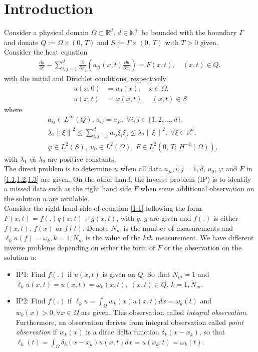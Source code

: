 \documentclass[]{article}
\begin{document}
\justifying

\thispagestyle{empty}

\newpage
\section{Introduction}
Consider a physical domain $\Omega \subset \mathbb{R}^d,\, d\in \mathbb{N^+}$ be bounded with the boundary $\Gamma$ and donate $Q:=\Omega\times (0,\, T)$ and $ S:=\Gamma \times (0,\, T)$ with $T>0$ given. 
\\
Consider the heat equation
\begin{align}\label{1.1}
	\frac{\partial u}{\partial t}-\sum_{i, j=1}^{d}\frac{\partial}{\partial x_j}\left(a_{ji}(x, t)\frac{\partial u}{\partial x_i}\right)=F(x, t), \quad(x, t)\in Q,
\end{align}
with the initial and Dirichlet conditions, respectively
\begin{align}
	u(x, 0)&=u_0(x),\quad x\in \Omega,\label{1.2}\\
	u(x, t)&=\varphi(x, t),\quad(x, t)\in S \label{1.3}
\end{align}
where
\begin{align*}
	&a_{ij}\in L^{\infty}(Q),\, a_{ij}=a_{ji},\; \forall i, j\in \{1, 2, ..., d\},\\
	&\lambda_1\left\|\xi\right\|^2\leq \sum_{i, j=1}^{d}a_{ij}\xi_i\xi_j\leq \lambda_2\left\|\xi\right\|^2,\; \forall \xi\in\mathbb{R}^d,\\
	&\varphi\in L^2(S),\; u_0\in L^2(\Omega),\; F\in L^2(0,\, T;\, H^{-1}(\Omega)),
\end{align*}
with $\lambda_1$ và $\lambda_2$ are positive constants.
\\
The direct problem is to determine $u$ when all data $a_{ji}, i, j=\overline{1, d}, \,u_0, \,\varphi$ and $F$ in \cref{1.1,1.2,1.3} are given. On the other hand, the inverse problem (IP) is to identify a missed data such as the right hand side $F$ when some additional observation on the solution $u$ are available. 
\\
Consider the right hand side of equation \eqref{1.1} following the form $F(x, t)=f(.)q(x, t)+g(x, t)$, with $q,\, g$ are given and $f(.)$ is either $f(x, t)$, $f(x)$ or $f(t)$. Denote $N_m$ is the number of measurements and $\ell_k u(f) =\omega_k, k=\overline{1, N_m}$ is the value of the $kth$ measurement. We have different inverse problems depending on either the form of $F$ or the observation on the solution $u$: 
\begin{itemize}
	\item IP1: Find $f(.)$ if $u(x, t)$ is given on $Q$. So that $N_m=1$ and $\ell_ku(x, t)=u(x, t)=\omega_k(x, t), \; (x, t)\in Q,\, k=\overline{1, N_m}$.
	\item IP2: Find $f(.)$ if $\ell_ku=\int_\Omega w_k(x)u(x, t)dx=\omega_k(t)$ and $w_k(x)>0, \forall x\in \Omega$ are given. This observation called \textit{integral observation}. Furthermore, an observation derives from integral observation called \textit{point observation} if $w_k(x)$ is a dirac delta function $\delta_k(x-x_k)$, so that $\ell_k(t)=\int_\Omega\delta_k(x-x_k)u(x, t)dx=u(x_k, t)=\omega_k(t)$.
\end{itemize}
\end{document}

